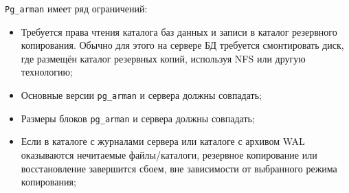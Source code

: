 \lstinline!Pg_arman! имеет ряд ограничений:

\begin{itemize}
  \item Требуется права чтения каталога баз данных и записи в каталог резервного копирования. Обычно для этого на сервере БД требуется смонтировать диск, где размещён каталог резервных копий, используя NFS или другую технологию;
  \item Основные версии \lstinline!pg_arman! и сервера должны совпадать;
  \item Размеры блоков \lstinline!pg_arman! и сервера должны совпадать;
  \item Если в каталоге с журналами сервера или каталоге с архивом WAL оказываются нечитаемые файлы/каталоги, резервное копирование или восстановление завершится сбоем, вне зависимости от выбранного режима копирования;
\end{itemize}
